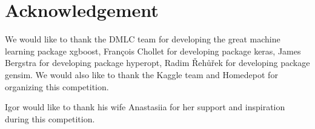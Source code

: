 \documentclass[12pt]{article}
\begin{document}
\section{Acknowledgement}
We would like to thank the DMLC team for developing the great machine learning package xgboost, Fran\c{c}ois Chollet for developing package keras, James Bergstra for developing package hyperopt, Radim {\v R}eh{\r u}{\v r}ek for developing package gensim. We would also like to thank the Kaggle team and Homedepot for organizing this competition.

Igor would like to thank his wife Anastasiia for her support and inspiration during this competition.






\end{document}
